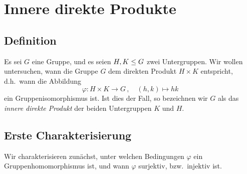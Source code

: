 \section{Innere direkte Produkte}





\subsection*{Definition}

Es sei $G$ eine Gruppe, und es seien $H, K \leq G$ zwei Untergruppen.
Wir wollen untersuchen, wann die Gruppe $G$ dem direkten Produkt $H \times K$ entspricht, d.h.\ wann die Abbildung
\[
          \varphi
  \colon  H \times K
  \to     G \,,
  \quad   (h,k)
  \mapsto hk
\]
ein Gruppenisomorphismus ist.
Ist dies der Fall, so bezeichnen wir $G$ als das \emph{innere direkte Produkt} der beiden Untergruppen $K$ und $H$.





\subsection*{Erste Charakterisierung}

Wir charakterisieren zunächst, unter welchen Bedingungen $\varphi$ ein Gruppenhomomorphismus ist, und wann $\varphi$ surjektiv, bzw.\ injektiv ist.

